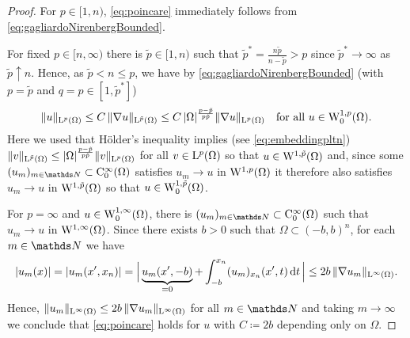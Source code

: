 \begin{proof}
  For $p \in [1,n)$, \eqref{eq:poincare} immediately follows from \eqref{eq:gagliardoNirenbergBounded}. 
  
  For fixed $p \in [n, \infty)$ there is $\tilde p \in [1,n)$ such that $\tilde p^* = \frac{n \tilde p}{n - \tilde p} > p$ since $\tilde p^* \to \infty$ as $\tilde p \uparrow n$.
    Hence, as $\tilde p < n \leq p$, we have by \eqref{eq:gagliardoNirenbergBounded} (with $p = \tilde p$ and $q = p \in [1,\tilde p^*]$)
    \begin{equation}
      \label{eq:gradientEstimatePoincare}
      \|u\|_{\mathrm{L}^p(\Omega)} 
      \leq C \, \|\nabla u\|_{\mathrm{L}^{\tilde p}(\Omega)}
      \leq C \, |\Omega|^{\frac{p - \tilde p}{p \tilde p}} \|\nabla u\|_{\mathrm{L}^p(\Omega)} \quad\text{for all } u \in \mathrm{W}_0^{1,p}(\Omega).
    \end{equation}
    Here we used that Hölder's inequality implies (see \eqref{eq:embeddingpltn}) $\|v\|_{\mathrm{L}^{\tilde p}(\Omega)} \leq |\Omega|^{\frac{p - \tilde p}{p \tilde p}} \|v\|_{\mathrm{L}^p(\Omega)}$ for all $v \in \mathrm{L}^p(\Omega)$ so that $u \in \mathrm{W}^{1,\tilde p}(\Omega)$ and, since some $(u_m)_{m \in \N} \subset \CC_0^\infty(\Omega)$ 
    satisfies $u_m \to u$ in $\mathrm{W}^{1,p}(\Omega)$ it therefore also satisfies $u_m \to u$ in $\mathrm{W}^{1,\tilde p}(\Omega)$ so that $u \in \mathrm{W}_0^{1,\tilde p} (\Omega)$.

    For $p = \infty$ and $u \in \mathrm{W}_0^{1,\infty}(\Omega)$, there is $(u_m)_{m \in \N} \subset \CC_0^\infty(\Omega)$ such that $u_m \to u$ in $\mathrm{W}^{1,\infty}(\Omega)$.
    Since there exists $b > 0$ such that $\Omega \subset (-b,b)^n$, for each $m \in \N$ we have
    $$
    |u_m(x)| 
    = | u_m(x',x_n)|
    = \Big|\underbrace{u_m(x', -b)}_{= 0} + \int_{-b}^{x_n} (u_m)_{x_n} (x',t)\, {\operatorname{d}\!{t}} \,\Big|
    \leq 2b \, \|\nabla u_m \|_{\mathrm{L}^\infty(\Omega)}.
    $$
    Hence, $\|u_m\|_{\mathrm{L}^\infty(\Omega)} \leq 2b \, \|\nabla u_m\|_{\mathrm{L}^\infty(\Omega)}$ for all $m \in \N$ and taking $m \to \infty$ we conclude that \eqref{eq:poincare} holds for $u$ with $C \coloneqq 2b$ depending only on $\Omega$.
\end{proof}


